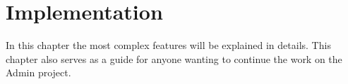 \chapter{Implementation}
In this chapter the most complex features will be explained in details. This chapter also serves as a guide for anyone wanting to continue the work on the Admin project.